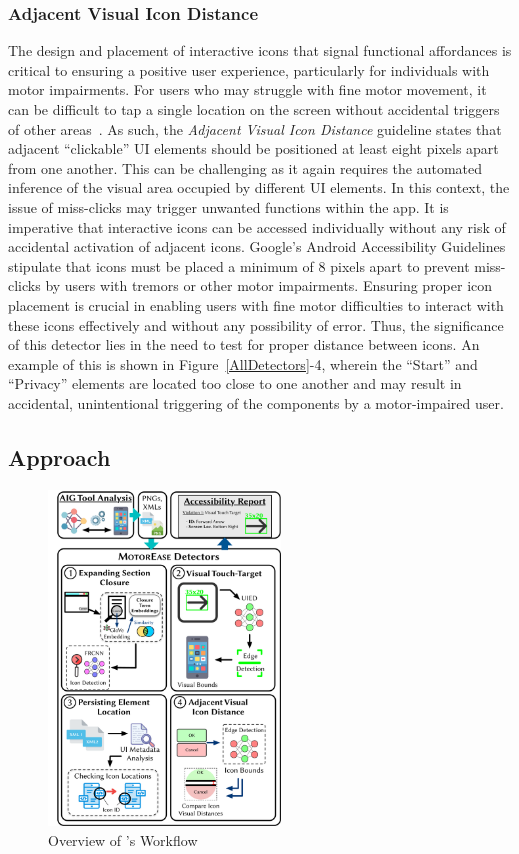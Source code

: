 \subsubsection{Adjacent Visual Icon Distance}

The design and placement of interactive icons that signal functional affordances is critical to ensuring a positive user experience, particularly for individuals with motor impairments. For users who may struggle with fine motor movement, it can be difficult to tap a single location on the screen without accidental triggers of other areas~\cite{Kong21}. As such, the \textit{Adjacent Visual Icon Distance} guideline states that adjacent ``clickable'' UI elements should be positioned at least eight pixels apart from one another.  This can be challenging as it again requires the automated inference of the visual area occupied by different UI elements. In this context, the issue of miss-clicks may trigger unwanted functions within the app. It is imperative that interactive icons can be accessed individually without any risk of accidental activation of adjacent icons. Google's Android Accessibility Guidelines \cite{GoogleAccess} stipulate that icons must be placed a minimum of 8 pixels apart to prevent miss-clicks by users with tremors or other motor impairments. Ensuring proper icon placement is crucial in enabling users with fine motor difficulties to interact with these icons effectively and without any possibility of error. Thus, the significance of this detector lies in the need to test for proper distance between icons.
An example of this is shown in Figure~\ref{AllDetectors}-4, wherein the ``Start'' and ``Privacy'' elements are located too close to one another and may result in accidental, unintentional triggering of the components by a motor-impaired user.

\subsection{\MotorEase Approach}


\begin{figure}[t]
	\centering
    \includegraphics[width=0.55\textwidth]{imgs/MotorEaseOverview.pdf}
    \caption{Overview of \MotorEase's Workflow}
    \label{fig:overview}
\end{figure}

